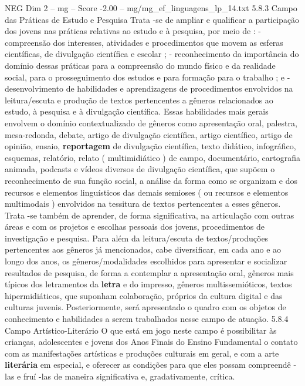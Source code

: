 \begin{textsample}{NEG Dim 2 – mg – Score -2.00 – mg/mg\_ef\_linguagens\_lp\_14.txt}  \label{ex:f2_neg_098}
5.8.3 Campo das Práticas de Estudo e Pesquisa Trata -se de ampliar e qualificar a participação dos jovens nas práticas relativas ao estudo e à pesquisa, por meio de : - compreensão dos interesses, atividades e procedimentos que movem as esferas científicas, de divulgação científica e escolar ; - reconhecimento da importância do domínio dessas práticas para a compreensão do mundo físico e da realidade social, para o prosseguimento dos estudos e para formação para o trabalho ; e - desenvolvimento de habilidades e aprendizagens de procedimentos envolvidos na leitura/escuta e produção de textos pertencentes a gêneros relacionados ao estudo, à pesquisa e à divulgação científica.
Essas habilidades mais gerais envolvem o domínio contextualizado de gêneros como apresentação oral, palestra, mesa-redonda, debate, artigo de divulgação científica, artigo científico, artigo de opinião, ensaio, \textbf{reportagem} de divulgação científica, texto didático, infográfico, esquemas, relatório, relato ( multimidiático ) de campo, documentário, cartografia animada, podcasts e vídeos diversos de divulgação científica, que supõem o reconhecimento de sua função social, a análise da forma como se organizam e dos recursos e elementos linguísticos das demais semioses ( ou recursos e elementos multimodais ) envolvidos na tessitura de textos pertencentes a esses gêneros.
Trata -se também de aprender, de forma significativa, na articulação com outras áreas e com os projetos e escolhas pessoais dos jovens, procedimentos de investigação e pesquisa.
Para além da leitura/escuta de textos/produções pertencentes aos gêneros já mencionados, cabe diversificar, em cada ano e ao longo dos anos, os gêneros/modalidades escolhidos para apresentar e socializar resultados de pesquisa, de forma a contemplar a apresentação oral, gêneros mais típicos dos letramentos da \textbf{letra} e do impresso, gêneros multissemióticos, textos hipermidiáticos, que suponham colaboração, próprios da cultura digital e das culturas juvenis.
Posteriormente, será apresentado o quadro com os objetos de conhecimento e habilidades a serem trabalhados nesse campo de atuação. 5.8.4 Campo Artístico-Literário O que está em jogo neste campo é possibilitar às crianças, adolescentes e jovens dos Anos Finais do Ensino Fundamental o contato com as manifestações artísticas e produções culturais em geral, e com a arte \textbf{literária} em especial, e oferecer as condições para que eles possam compreendê -las e fruí -las de maneira significativa e, gradativamente, crítica.

\end{textsample}
